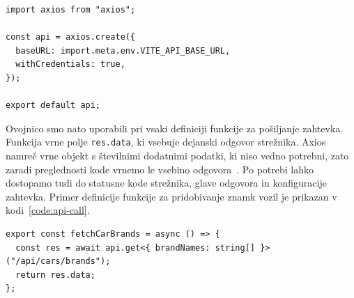 \documentclass[a4paper,12pt,openright]{book}
\begin{document}
\begin{center}
\label{code:api-wrapper}
\begin{verbatim}
import axios from "axios";

const api = axios.create({
  baseURL: import.meta.env.VITE_API_BASE_URL,
  withCredentials: true,
});

export default api;
\end{verbatim}
\end{center}

Ovojnico smo nato uporabili pri vsaki definiciji funkcije za pošiljanje zahtevka. Funkcija vrne polje
\texttt{res.data}, ki vsebuje dejanski odgovor strežnika. Axios namreč vrne objekt s številnimi dodatnimi
podatki, ki niso vedno potrebni, zato zaradi preglednosti kode vrnemo le vsebino odgovora~\cite{axios-docs}. Po potrebi lahko
dostopamo tudi do statusne kode strežnika, glave odgovora in konfiguracije zahtevka. Primer definicije funkcije za
pridobivanje znamk vozil je prikazan v kodi~\ref{code:api-call}.

\begin{center}
\label{code:api-call}
\begin{verbatim}
export const fetchCarBrands = async () => {
  const res = await api.get<{ brandNames: string[] }>("/api/cars/brands");
  return res.data;
};
\end{verbatim}
\end{center}
\end{document}
